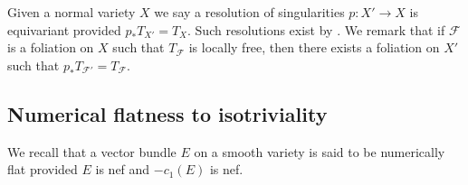 \documentclass[12pt]{amsart}
\theoremstyle{plain}
\theoremstyle{definition}
\begin{document}
Given a normal variety $X$ we say a resolution of singularities $p\colon X' \rightarrow X$ is equivariant
provided $p_*T_{X'} = T_X$.  Such resolutions exist by \cite[Theorem 3.26]{MR2289519}.
We remark that if $\mathcal F$ is a foliation on $X$ such that $T_{\mathcal F}$ is locally free, 
then there exists a foliation on $X'$ such that $p_*T_{\mathcal F'} = T_{\mathcal F}$.






\subsection{Numerical flatness to isotriviality}

We recall that a vector bundle $E$ on a smooth variety is said to be numerically flat provided 
$E$ is nef and $-c_1(E)$ is nef.
\end{document}
